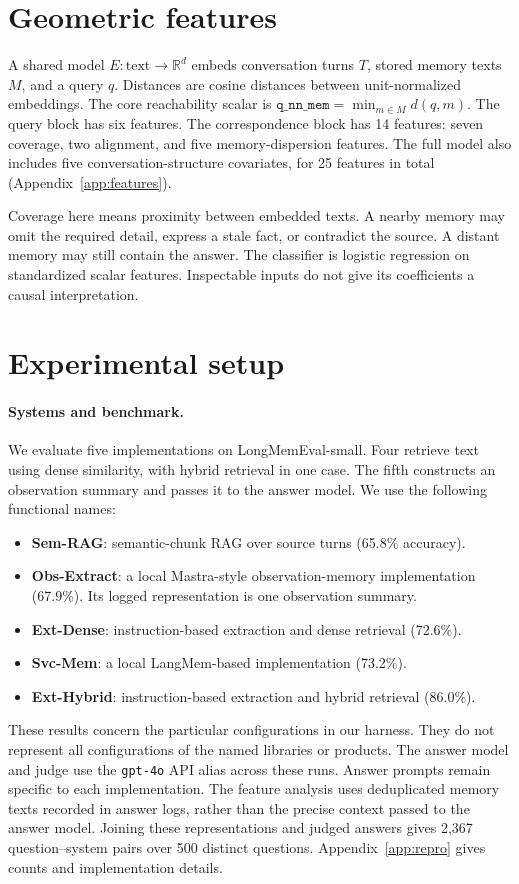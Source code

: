 \documentclass{article}
\begin{document}
\section{Geometric features}
\label{sec:features}

A shared model $E:\text{text}\to\mathbb{R}^d$ embeds conversation turns $T$,
stored memory texts $M$, and a query $q$. Distances are cosine distances between
unit-normalized embeddings. The core reachability scalar is
$\texttt{q\_nn\_mem}=\min_{m\in M}d(q,m)$.
The query block has six features. The correspondence block has 14 features:
seven coverage, two alignment, and five memory-dispersion features.
The full model also includes five conversation-structure covariates,
for 25 features in total (Appendix~\ref{app:features}).

Coverage here means proximity between embedded texts.
A nearby memory may omit the required detail, express a stale fact, or contradict
the source. A distant memory may still contain the answer.
The classifier is logistic regression on standardized scalar features.
Inspectable inputs do not give its coefficients a causal interpretation.

\section{Experimental setup}
\label{sec:setup}

\paragraph{Systems and benchmark.}
We evaluate five implementations on LongMemEval-small.
Four retrieve text using dense similarity, with hybrid retrieval in one case.
The fifth constructs an observation summary and passes it to the answer model.
We use the following functional names:
\begin{itemize}[leftmargin=1.2em,itemsep=1pt,topsep=2pt]
\item \textbf{Sem-RAG}: semantic-chunk RAG over source turns (65.8\% accuracy).
\item \textbf{Obs-Extract}: a local Mastra-style observation-memory implementation
  (67.9\%). Its logged representation is one observation summary.
\item \textbf{Ext-Dense}: instruction-based extraction and dense retrieval (72.6\%).
\item \textbf{Svc-Mem}: a local LangMem-based implementation (73.2\%).
\item \textbf{Ext-Hybrid}: instruction-based extraction and hybrid retrieval (86.0\%).
\end{itemize}
These results concern the particular configurations in our harness.
They do not represent all configurations of the named libraries or products.
The answer model and judge use the \texttt{gpt-4o} API alias across these runs.
Answer prompts remain specific to each implementation.
The feature analysis uses deduplicated memory texts recorded in answer logs,
rather than the precise context passed to the answer model.
Joining these representations and judged answers gives 2{,}367
question--system pairs over 500 distinct questions.
Appendix~\ref{app:repro} gives counts and implementation details.
\end{document}
